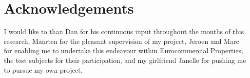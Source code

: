 \section{Acknowledgements}
\label{section:acknowledgements}
I would like to than Dan for his continuous input throughout the months of this research, Maarten for the pleasant supervision of my project, Jeroen and Marc for enabling me to undertake this endeavour within Eurocommercial Properties, the test subjects for their participation, and my girlfriend Janelle for pushing me to pursue my own project.